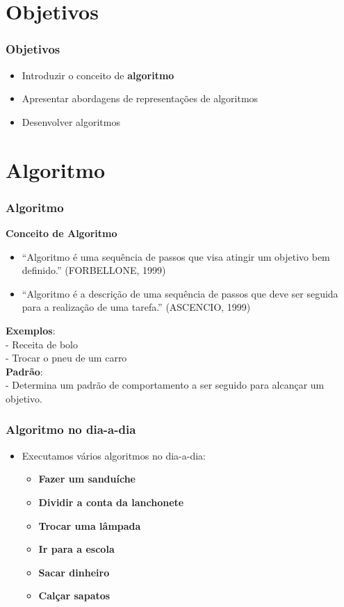 \section{Objetivos}

\begin{frame}
	\frametitle{Objetivos}
	\begin{itemize}
		\item Introduzir o conceito de \textbf{algoritmo}
		\item Apresentar abordagens de representações de algoritmos
		\item Desenvolver algoritmos
	\end{itemize}
\end{frame}



\section{Algoritmo}

\begin{frame}
	\frametitle{Algoritmo}
	\begin{block}{\textbf{Conceito de Algoritmo}}
		\begin{itemize}
			\item ``Algoritmo é uma sequência de passos que visa atingir um objetivo bem definido.'' (FORBELLONE, 1999)
			\item ``Algoritmo é a descrição de uma sequência de passos que deve ser seguida para a realização de uma tarefa.'' (ASCENCIO, 1999)
		\end{itemize}
	\end{block}
	
	\textbf{Exemplos}:\\
	- Receita de bolo\\
	- Trocar o pneu de um carro\\[2ex]

	\textbf{Padrão}:\\
	- Determina um padrão de comportamento a ser seguido para alcançar um objetivo.
\end{frame}


\begin{frame}
	\frametitle{Algoritmo no dia-a-dia}
	\begin{itemize}
		\item Executamos vários algoritmos no dia-a-dia: 
		\begin{itemize}
			\item \textbf{Fazer um sanduíche}
			\item \textbf{Dividir a conta da lanchonete}
			\item \textbf{Trocar uma lâmpada}
			\item \textbf{Ir para a escola}
			\item \textbf{Sacar dinheiro}
			\item \textbf{Calçar sapatos}
		\end{itemize}
	\end{itemize}
\end{frame}


